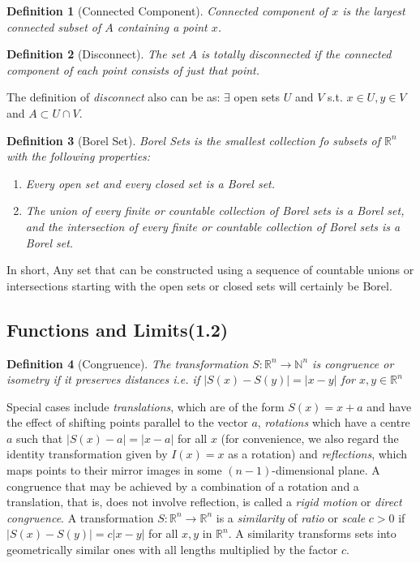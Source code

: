 \documentclass[12pt, a4paper]{article}
\newtheorem{definition}{Definition}[subsection]
\begin{document}
\begin{definition}[Connected Component]
Connected component of $x$ is the largest connected subset of $A$ containing a point $x$.
\end{definition}

\begin{definition}[Disconnect]
    The set $A$ is totally disconnected if the connected component of each point consists of just that point.
\end{definition}

The definition of \textit{disconnect} also can be as: $\exists$ open sets $U$ and $V$ s.t. $x\in U, y\in V$ and $A\subset U\cap V$.

\begin{definition}[Borel Set]
    Borel Sets is the smallest collection fo subsets of $\mathbb{R}^n$ with the following properties:
    \begin{enumerate}
        \item Every open set and every closed set is a Borel set.
        \item The union of every finite or countable collection of Borel sets is a Borel set, and the intersection of every finite or countable collection of Borel sets is a Borel set.
    \end{enumerate}
\end{definition}

In short, Any set that can be constructed using a sequence of countable unions or intersections starting with the open sets or closed sets will certainly be Borel.

\subsection{Functions and Limits(1.2)}

\begin{definition}[Congruence]
    The transformation $S : \mathbb{R}^n\rightarrow \mathbb{N}^n$ is congruence or isometry if it preserves distances i.e. if $|S(x)-S(y)| = |x-y|$ for $x, y\in \mathbb{R}^n$
    
\end{definition}

Special cases include \textit{translations}, which are of the form 
$S(x)=x+a$ and have the effect of shifting points parallel 
to the vector $a$, \textit{rotations} which have a centre $a$ such 
that $|S(x)-a|=|x-a|$ for all $x$ (for convenience, we also 
regard the identity transformation given by $I(x)=x$ as a 
rotation) and \textit{reflections}, which maps points to their mirror 
images in some $(n-1)$-dimensional plane. A congruence that 
may be achieved by a combination of a rotation and a translation, 
that is, does not involve reflection, is called a \textit{rigid motion} or 
\textit{direct congruence}. A transformation 
$S: \mathbb{R}^{n} \rightarrow \mathbb{R}^{n}$ is a \textit{similarity} of 
\textit{ratio} or \textit{scale} $c>0$ if $|S(x)-S(y)|=c|x-y|$ for all $x, y$ 
in $\mathbb{R}^{n} .$ A similarity transforms sets into geometrically 
similar ones with all lengths multiplied by the factor $c$.
\end{document}
